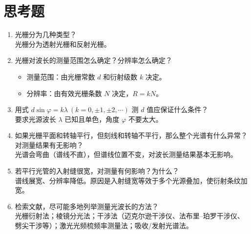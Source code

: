 \documentclass[a4paper,8pt,twocolumn]{article}
\begin{document}
\section{思考题}
 \begin{enumerate}
  \item 光栅分为几种类型？\\
  光栅分为透射光栅和反射光栅。

  \item 光栅对波长的测量范围怎么确定？分辨率怎么确定？\\  
  \begin{itemize}
    \item 测量范围：由光栅常数 $d$ 和衍射级数 $k$ 决定。  
    \item 分辨率：由有效光栅条数 $N$ 决定，$R = kN$。
  \end{itemize}

  \item 用式 $d \sin \varphi = k \lambda \ (k=0,\pm1,\pm2,\cdots)$ 测 $d$ 值应保证什么条件？\\  
  要求光源波长 $\lambda$ 已知且单色，角度 $\varphi$ 不要太大。

  \item 如果光栅平面和转轴平行，但刻线和转轴不平行，那么整个光谱有什么异常？对测量结果有无影响？\\
  光谱会弯曲（谱线不直），但谱线位置不变，对波长测量结果基本无影响。

  \item 若平行光管的入射缝很宽，对测量有何影响？为什么？\\
  谱线展宽、分辨率降低。原因是入射缝宽等效于多个光源叠加，使衍射条纹加宽。

  \item 检索文献，尽可能多地列举测量光波长的方法？\\ 
  光栅衍射法；棱镜分光法；干涉法（迈克尔逊干涉仪、法布里–珀罗干涉仪、劈尖干涉等）；激光光频梳频率测量法；吸收/发射光谱法。
\end{enumerate}
\end{document}

